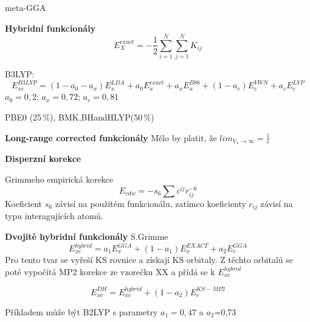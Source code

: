 meta-GGA

\textbf{Hybridní funkcionály}
\begin{equation}
E_X^{exact}=-\frac{1}{2}\sum_{i=1}^N\sum_{j=1}^N K_{ij}
\end{equation}

B3LYP:
\begin{equation}
E_{xc}^{B3LYP}=(1-a_0-a_x)E_x^{LDA}+a_0E_x^{exact}+a_xE_x^{B88}+(1-a_c)E_c^{VWN}+a_c E_c^{LYP}
\end{equation}
$a_0=0,2$; $a_x=0,72$; $a_c=0,81$

PBE0 (25\,\%), BMK,BHandHLYP(50\,\%)

\textbf{Long-range corrected funkcionály}
Mělo by platit, že $lim_{V_x\to \infty}=\frac{1}{r}$

\textbf{Disperzní korekce}

Grimmeho empirická korekce
\begin{equation}
E_{vdw}=-s_6\sum c^{ij}r_{ij}^{-6}
\end{equation}
Koeficient $s_6$ závisí na použitém funkcionálu, zatímco koeficienty $c_{ij}$ závisí na typu interagujících atomů.

\textbf{Dvojitě hybridní funkcionály}
S.Grimme 
\begin{equation}
E_{xc}^{hybrid}=a_1E_x^{GGA}+(1-a_1)E_x^{EXACT}+a_2E_c^{GGA}
\end{equation}
Pro tento tvar se vyřeší KS rovnice a získají KS orbitaly. Z těchto orbitalů se poté vypočítá MP2 korekce
ze vzorečku XX a přídá se k $E_{xc}^{hybrid}$

\begin{equation}
E_{xc}^{DH}=E_{xc}^{hybrid}+(1-a_2)E_c^{KS-MP2}
\end{equation}

Příkladem může být B2LYP s parametry $a_1=0,47$ a $a_2$=0,73

